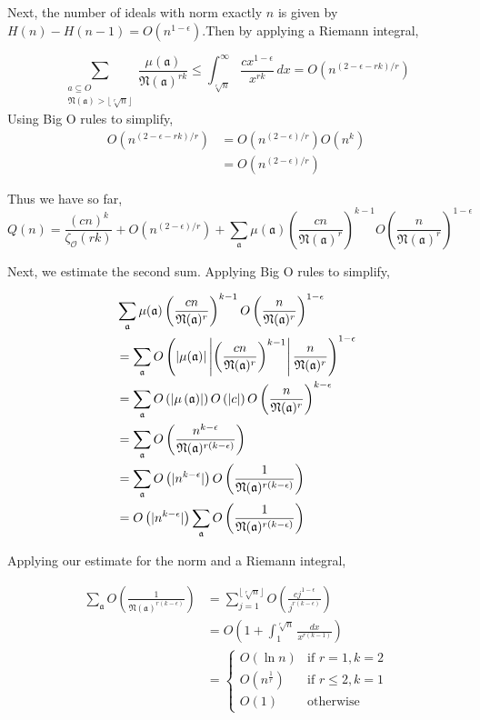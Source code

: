 \documentclass[10pt,a4paper]{article}
\theoremstyle{definition}
\theoremstyle{remark}
\newcommand{\f}[1]{\mathfrak{#1}}
\begin{document}
	Next, the number of ideals with norm exactly \(n\) is given by \(H(n)-H(n-1)=O(n^{1-\epsilon})\).Then by applying a Riemann integral, 
	
	\begin{equation}
		\sum_{\substack{a\subseteq O\\ 
				\f{N}(\f{a}) > \lfloor\sqrt[r]{n}\rfloor}} \frac{\mu(\f{a})}{\f{N}(\f{a})^{rk}} \leq \int_{\sqrt[r]{n}}^{\infty}\frac{cx^{1-\epsilon}}{x^{rk}}\, dx = O(n^{(2-\epsilon-rk)/r})
	\end{equation}
	Using Big O rules to simplify,
	\begin{align}
	 O(n^{(2-\epsilon-rk)/r}) &= O(n^{(2-\epsilon)/r})O(n^{k})\\
	 & =  O(n^{(2-\epsilon)/r})
	\end{align}
	
	Thus we have so far, 
	\begin{equation}
		Q(n)=\frac{(cn)^k}{\zeta_{\mathcal{O}}(rk)}+O(n^{(2-\epsilon)/r}) +\sum_{\f{a}}\mu(\f{a})\left(\frac{cn}{\f{N}(\f{a})^r}\right)^{k-1}O\left(\frac{n}{\f{N}(\f{a})^r}\right)^{1-\epsilon}
	\end{equation}

	Next, we estimate the second sum. Applying Big O rules to simplify, 
	
	\begin{align}	
	&\sum_{\f{a}}\mu(\f{a})\left(\frac{cn}{\f{N}(\f{a})^r}\right)^{k-1}O\left(\frac{n}{\f{N}(\f{a})^r}\right)^{1-\epsilon}\\
	&=\sum_{\f{a}}O\left(\left|\mu(\f{a})\right|\left|\left(\frac{cn}{\f{N}(\f{a})^r}\right)^{k-1}\right|\frac{n}{\f{N}(\f{a})^r}\right)^{1-\epsilon}\notag\\
	&=\sum_{\f{a}}O\left(\left|\mu\left(\f{a}\right)\right|\right)O\left(|c|\right)O\left(\frac{n}{\f{N}(\f{a})^r}\right)^{k-\epsilon}\notag\\
	&=\sum_{\f{a}}O\left(\frac{n^{k-\epsilon}}{\f{N}(\f{a})^{r(k-\epsilon)}}\right)\notag\\
	&=\sum_{\f{a}}O\left(|n^{k-\epsilon}|\right)O\left(\frac{1}{\f{N}(\f{a})^{r(k-\epsilon)}}\right)\\
	&=O\left(|n^{k-\epsilon}|\right)\sum_{\f{a}}O\left(\frac{1}{\f{N}(\f{a})^{r(k-\epsilon)}}\right)
	\end{align}

	Applying our estimate for the norm and a Riemann integral, 
	
	\begin{align}
		\sum_{\f{a}}O\left(\frac{1}{\f{N}(\f{a})^{r(k-\epsilon)}}\right) &= \sum_{j=1}^{\lfloor \sqrt[r]{n} \rfloor} O\left(\frac{cj^{1-\epsilon}}{j^{r(k-\epsilon)}}\right)\\
		&= O\left(1+\int_{1}^{\sqrt[r]{n}} \frac{dx}{x^{r(k-1)}}\right)\\
		&= \begin{cases}
			O(\ln n) & \text{if } r=1, k=2 \\
			O(n^\frac{1}{r}) & \text{if } r\leq2, k=1 \\
			O(1) & \text{otherwise}
		\end{cases}
	\end{align}
\end{document}
